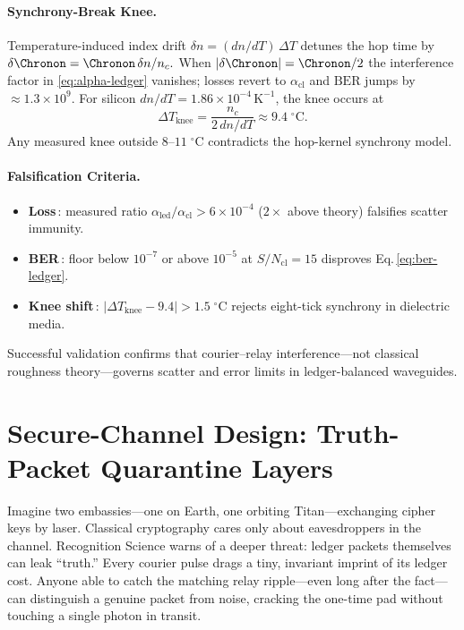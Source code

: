\documentclass[11pt,oneside]{book}
\begin{document}
{\paragraph{Synchrony-Break Knee.}
Temperature-induced index drift
$\delta n\!=\!(dn/dT)\,\Delta T$
detunes the hop time by
\(
   \delta\Chronon = \Chronon\,\delta n/n_{c}.
\)
When
\(
   |\delta\Chronon|=\Chronon/2
\)
the interference factor in \eqref{eq:alpha-ledger} vanishes; losses
revert to $\alpha_{\text{cl}}$ and $\mathrm{BER}$ jumps by
\(
   \approx\!1.3\times10^{9}.
\)
For silicon
\(
   dn/dT = 1.86\times10^{-4}\,\mathrm{K^{-1}}
\),
the knee occurs at
\[
   \Delta T_{\text{knee}}
   =
   \frac{n_{c}}{2\,dn/dT}
   \approx
   9.4\;^{\circ}\mathrm{C}.
\]
Any measured knee outside
$8$–$11\;^{\circ}\mathrm{C}$ contradicts the
hop-kernel synchrony model.

\paragraph{Falsification Criteria.}
\begin{itemize}\setlength\itemsep{3pt}
\item \textbf{Loss}\,: measured ratio
      $\alpha_{\text{led}}/\alpha_{\text{cl}}>6\times10^{-4}$
      (\(2\times\) above theory) falsifies scatter immunity.
\item \textbf{BER}\,: floor below
      $10^{-7}$ or above $10^{-5}$ at
      $S/N_{\text{cl}}\!=\!15$ disproves
      Eq.\,\eqref{eq:ber-ledger}.
\item \textbf{Knee shift}\,: 
      $|\Delta T_{\text{knee}}-9.4|>1.5\;^{\circ}\text{C}$
      rejects eight-tick synchrony in dielectric media.
\end{itemize}

Successful validation confirms that courier–relay interference—not
classical roughness theory—governs scatter and error limits in
ledger-balanced waveguides.


\section{Secure-Channel Design: Truth-Packet Quarantine Layers}
\label{sec:truth-quarantine-narrative}

Imagine two embassies—one on Earth, one orbiting Titan—exchanging
cipher keys by laser.  Classical cryptography cares only about
eavesdroppers in the channel.  Recognition Science warns of a deeper
threat: ledger packets themselves can leak “truth.”  Every courier
pulse drags a tiny, invariant imprint of its ledger cost.  Anyone able
to catch the matching relay ripple—even long after the fact—can
distinguish a genuine packet from noise, cracking the one-time pad
without touching a single photon in transit.

}
\end{document}
